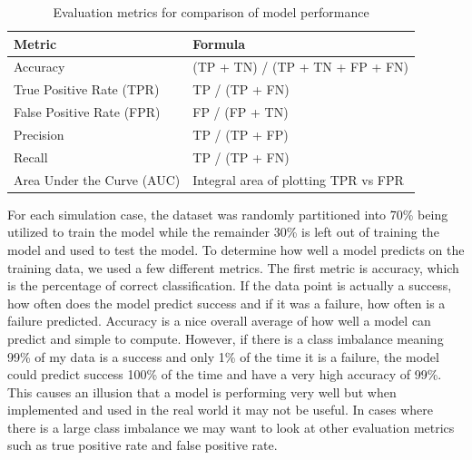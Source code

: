 \documentclass{llncs}
\begin{document}
\begin{table}[]
\centering
\caption{Evaluation metrics for comparison of model performance}
\label{eval_metrics}
\begin{tabular}{|l|l|}
\hline
{\bf Metric}              & {\bf Formula}                         \\ \hline
Accuracy                   & (TP + TN) / (TP + TN + FP + FN)      \\ \hline
True Positive Rate (TPR)   & TP / (TP + FN)                       \\ \hline
False Positive Rate (FPR)  & FP / (FP + TN)                       \\ \hline
Precision                  & TP / (TP + FP)                       \\ \hline
Recall                     & TP / (TP + FN)                       \\ \hline
Area Under the Curve (AUC) & Integral area of plotting TPR vs FPR \\ \hline
\end{tabular}
\end{table}

For each simulation case, the dataset was randomly partitioned into 70\% being utilized to train the model while the remainder 30\% is left out of training the model and used to test the model. To determine how well a model predicts on the training data, we used a few different metrics. The first metric is accuracy, which is the percentage of correct classification. If the data point is actually a success, how often does the model predict success and if it was a failure, how often is a failure predicted. Accuracy is a nice overall average of how well a model can predict and simple to compute.  However, if there is a class imbalance meaning 99\% of my data is a success and only 1\% of the time it is a failure, the model could predict success 100\% of the time and have a very high accuracy of 99\%.  This causes an illusion that a model is performing very well but when implemented and used in the real world it may not be useful. In cases where there is a large class imbalance we may want to look at other evaluation metrics such as true positive rate and false positive rate.  
\end{document}
